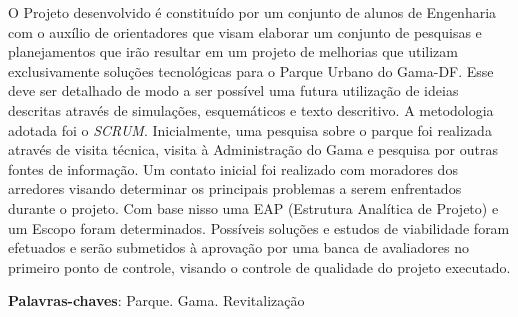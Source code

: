 \begin{resumo}
O Projeto desenvolvido \'e constitu\'ido por um conjunto de alunos de Engenharia com o aux\'ilio de orientadores que visam elaborar um conjunto de pesquisas e planejamentos que ir\~ao resultar em um projeto de melhorias que utilizam exclusivamente solu\c{c}\~oes tecnol\'ogicas para o Parque Urbano do Gama-DF. Esse deve ser detalhado de modo a ser poss\'ivel uma futura utiliza\c{c}\~ao de ideias descritas atrav\'es de simula\c{c}\~oes, esquem\'aticos e texto descritivo. A metodologia adotada foi o \textit{SCRUM}. Inicialmente, uma pesquisa sobre o parque foi realizada atrav\'es de visita t\'ecnica, visita \`a Administra\c{c}\~ao do Gama e pesquisa por outras fontes de informa\c{c}\~ao.  Um contato inicial foi realizado com moradores dos arredores visando determinar os principais problemas a serem enfrentados durante o projeto. Com base nisso uma EAP (Estrutura Anal\'itica de Projeto) e um Escopo foram determinados. Poss\'iveis solu\c{c}\~oes e estudos de viabilidade foram efetuados e ser\~ao submetidos \`a aprova\c{c}\~ao por uma banca de avaliadores no primeiro ponto de controle, visando o controle de qualidade do projeto executado.

 \vspace{\onelineskip}
    
 \noindent
 \textbf{Palavras-chaves}: Parque. Gama. Revitaliza\c{c}\~ao
\end{resumo}
